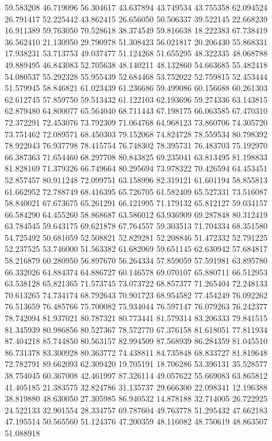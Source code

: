 59.583208
46.719096
56.304617
43.637894
43.749534
43.755358
62.094524
26.791417
52.225442
43.862415
26.656050
50.506337
39.522145
22.668239
16.911389
59.763050
70.528618
38.374549
59.816638
18.222383
67.738419
36.562410
21.130950
29.790978
51.308423
56.021817
20.206430
55.868331
17.938231
53.713753
49.037477
51.124268
51.655295
48.322335
48.068788
49.889495
46.843083
52.705638
48.140211
48.132860
54.663685
55.482418
54.080537
55.292328
55.955439
52.684468
53.752022
52.759815
52.453444
51.579945
58.846821
61.023439
61.236686
59.499086
60.156688
60.261303
62.612745
57.859750
59.513432
61.122103
62.193696
59.274336
63.143815
62.879480
64.800077
65.564040
68.711443
67.198175
66.063585
67.470310
72.372291
72.453076
73.792309
71.064768
64.968123
73.860706
74.305720
73.751462
72.089571
68.450303
79.152068
74.824728
78.559534
80.798392
78.922043
76.937798
78.415754
76.748302
78.395731
76.483703
75.192970
66.387363
71.654460
68.297708
80.843825
69.235041
63.813495
81.198833
81.828169
71.379326
66.749664
80.295694
73.978322
70.426594
64.453451
52.857457
80.911248
72.099751
63.158996
82.319121
61.601194
58.855813
61.662952
72.788749
68.416395
65.726705
61.582409
65.527331
73.516087
58.840021
67.673675
65.261291
66.121995
71.179132
65.812127
59.034157
66.584290
64.455260
58.868687
63.586012
63.936909
69.287848
80.312419
63.784545
59.643175
69.621878
67.764557
59.303513
71.704334
68.351580
54.725492
50.681059
52.508821
52.829281
52.208846
51.472332
52.791225
52.237525
53.746000
51.563382
61.682069
59.651145
62.630942
57.684817
58.216879
60.280950
56.897670
56.264334
57.859059
57.591981
63.895780
66.332026
64.884374
64.886727
60.146578
69.070107
65.880711
66.512953
63.538128
65.821365
71.573745
73.073722
68.857377
71.265404
72.248133
70.613265
74.734174
68.792643
70.901723
68.954582
77.454249
76.092262
76.513659
76.485766
75.700082
75.934044
76.597147
76.079263
76.242377
78.742094
81.937021
80.787321
80.773441
81.579314
83.206333
79.841515
81.345939
80.986856
80.527367
78.572770
67.376158
81.618051
77.811934
87.404218
85.744850
80.563157
82.994509
87.568939
86.284359
81.045510
86.731378
83.300928
80.363772
74.438811
84.735848
68.833727
81.819648
72.782791
89.662093
62.309420
19.705191
18.706286
53.396131
35.528577
38.754045
60.367008
42.461997
87.326114
49.057622
55.669083
63.865812
41.405185
21.383575
32.824786
31.135737
29.666300
22.098341
12.196388
38.819880
48.630050
27.305985
86.940532
14.878188
32.714005
26.722925
24.522133
32.901554
28.334757
69.787604
49.763778
51.295432
47.662183
47.195514
50.565560
51.124376
47.200359
48.116082
48.750619
48.863507
51.088918

